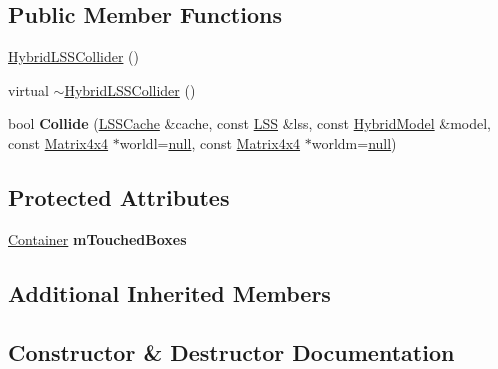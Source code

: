 \subsection*{Public Member Functions}
\begin{DoxyCompactItemize}
\item 
\hyperlink{classOpcode_1_1HybridLSSCollider_a766334bb5e4944577eaa425d00c45d84}{Hybrid\+L\+S\+S\+Collider} ()
\item 
virtual \hyperlink{classOpcode_1_1HybridLSSCollider_ade63c5a6ff2bb9f94749a6be867afbe7}{$\sim$\+Hybrid\+L\+S\+S\+Collider} ()
\item 
bool {\bfseries Collide} (\hyperlink{structOpcode_1_1LSSCache}{L\+S\+S\+Cache} \&cache, const \hyperlink{classOpcode_1_1LSS}{L\+SS} \&lss, const \hyperlink{classOpcode_1_1HybridModel}{Hybrid\+Model} \&model, const \hyperlink{classOpcode_1_1Matrix4x4}{Matrix4x4} $\ast$worldl=\hyperlink{IceTypes_8h_ac97b8ee753e4405397a42ad5799b0f9e}{null}, const \hyperlink{classOpcode_1_1Matrix4x4}{Matrix4x4} $\ast$worldm=\hyperlink{IceTypes_8h_ac97b8ee753e4405397a42ad5799b0f9e}{null})\hypertarget{classOpcode_1_1HybridLSSCollider_ab66b69917863c7fb1dc5229401ce9def}{}\label{classOpcode_1_1HybridLSSCollider_ab66b69917863c7fb1dc5229401ce9def}

\end{DoxyCompactItemize}
\subsection*{Protected Attributes}
\begin{DoxyCompactItemize}
\item 
\hyperlink{classContainer}{Container} {\bfseries m\+Touched\+Boxes}\hypertarget{classOpcode_1_1HybridLSSCollider_a3cb8989477263966201b9e35eacdd0ee}{}\label{classOpcode_1_1HybridLSSCollider_a3cb8989477263966201b9e35eacdd0ee}

\end{DoxyCompactItemize}
\subsection*{Additional Inherited Members}


\subsection{Constructor \& Destructor Documentation}
